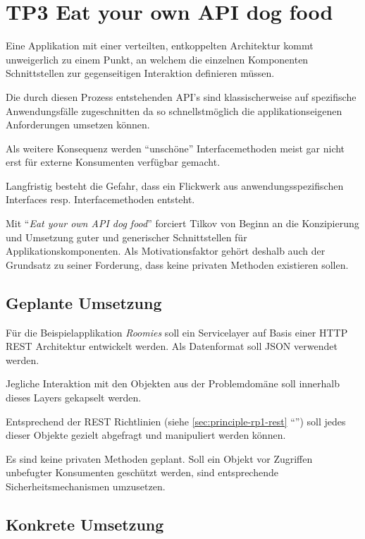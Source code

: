 \section{TP3 Eat your own API dog food}
\label{sec:principle-tp3-eat-your-own-api}

Eine Applikation mit einer verteilten, entkoppelten Architektur kommt unweigerlich zu einem Punkt, an welchem die einzelnen Komponenten Schnittstellen zur gegenseitigen Interaktion definieren müssen.

Die durch diesen Prozess entstehenden API's sind klassischerweise auf spezifische Anwendungsfälle zugeschnitten da so schnellstmöglich die applikationseigenen Anforderungen umsetzen können.

Als weitere Konsequenz werden ``unschöne'' Interfacemethoden meist gar nicht erst für externe Konsumenten verfügbar gemacht.

Langfristig besteht die Gefahr, dass ein Flickwerk aus anwendungsspezifischen Interfaces resp. Interfacemethoden entsteht.

Mit ``\emph{Eat your own API dog food}'' forciert Tilkov \cite{TilkovSlides} von Beginn an die Konzipierung und Umsetzung guter und generischer Schnittstellen für Applikationskomponenten. Als Motivationsfaktor gehört deshalb auch der Grundsatz zu seiner Forderung, dass keine privaten Methoden existieren sollen.


\subsection*{Geplante Umsetzung}

Für die Beispielapplikation \emph{Roomies} soll ein Servicelayer auf Basis einer HTTP \gls{REST} Architektur entwickelt werden. Als Datenformat soll \gls{JSON} verwendet werden.

Jegliche Interaktion mit den Objekten aus der Problemdomäne soll innerhalb dieses Layers gekapselt werden.

Entsprechend der \gls{REST} Richtlinien (siehe \ref{sec:principle-rp1-rest} ``'') soll jedes dieser Objekte gezielt abgefragt und manipuliert werden können.

Es sind keine privaten Methoden geplant. Soll ein Objekt vor Zugriffen unbefugter Konsumenten geschützt werden, sind entsprechende Sicherheitsmechanismen umzusetzen.


\subsection*{Konkrete Umsetzung}

